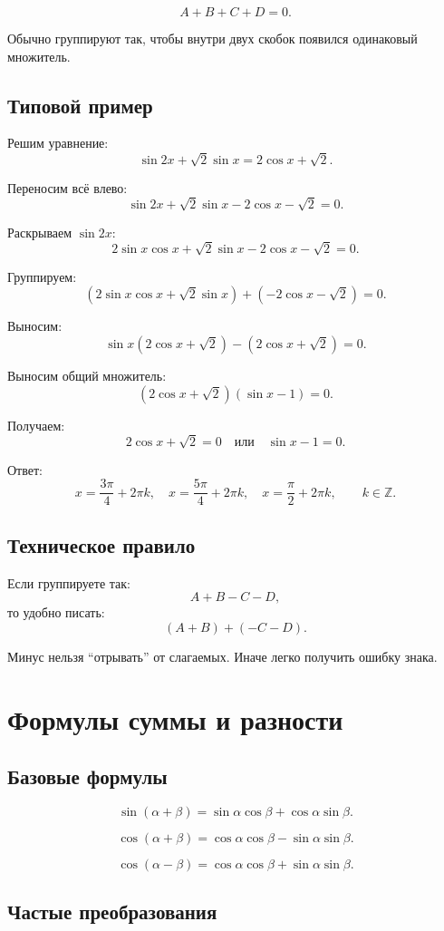 \documentclass[a4paper,12pt]{article}
\begin{document}
\[
A+B+C+D=0.
\]

Обычно группируют так, чтобы внутри двух скобок появился одинаковый множитель.

\subsection{Типовой пример}

Решим уравнение:
\[
\sin 2x+\sqrt2\sin x=2\cos x+\sqrt2.
\]

Переносим всё влево:
\[
\sin 2x+\sqrt2\sin x-2\cos x-\sqrt2=0.
\]

Раскрываем $\sin 2x$:
\[
2\sin x\cos x+\sqrt2\sin x-2\cos x-\sqrt2=0.
\]

Группируем:
\[
(2\sin x\cos x+\sqrt2\sin x)+(-2\cos x-\sqrt2)=0.
\]

Выносим:
\[
\sin x(2\cos x+\sqrt2)-(2\cos x+\sqrt2)=0.
\]

Выносим общий множитель:
\[
(2\cos x+\sqrt2)(\sin x-1)=0.
\]

Получаем:
\[
2\cos x+\sqrt2=0
\quad\text{или}\quad
\sin x-1=0.
\]

Ответ:
\[
x=\frac{3\pi}{4}+2\pi k,\quad
x=\frac{5\pi}{4}+2\pi k,\quad
x=\frac{\pi}{2}+2\pi k,
\qquad k\in\mathbb Z.
\]

\subsection{Техническое правило}

Если группируете так:
\[
A+B-C-D,
\]
то удобно писать:
\[
(A+B)+(-C-D).
\]

Минус нельзя ``отрывать'' от слагаемых. Иначе легко получить ошибку знака.

\section{Формулы суммы и разности}

\subsection{Базовые формулы}

\[
\sin(\alpha+\beta)=\sin\alpha\cos\beta+\cos\alpha\sin\beta.
\]

\[
\cos(\alpha+\beta)=\cos\alpha\cos\beta-\sin\alpha\sin\beta.
\]

\[
\cos(\alpha-\beta)=\cos\alpha\cos\beta+\sin\alpha\sin\beta.
\]

\subsection{Частые преобразования}
\end{document}

